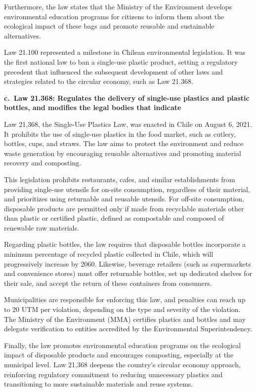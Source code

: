 \documentclass[
  12pt,
  oneside]{book}
\begin{document}
Furthermore, the law states that the Ministry of the Environment
develops environmental education programs for citizens to inform them
about the ecological impact of these bags and promote reusable and
sustainable alternatives.

Law 21.100 represented a milestone in Chilean environmental legislation.
It was the first national law to ban a single-use plastic product,
setting a regulatory precedent that influenced the subsequent
development of other laws and strategies related to the circular
economy, such as Law 21.368.

\textbf{c.~Law 21.368: Regulates the delivery of single-use plastics and
plastic bottles, and modifies the legal bodies that indicate}

Law 21,368, the Single-Use Plastics Law, was enacted in Chile on August
6, 2021. It prohibits the use of single-use plastics in the food market,
such as cutlery, bottles, cups, and straws. The law aims to protect the
environment and reduce waste generation by encouraging reusable
alternatives and promoting material recovery and composting.

This legislation prohibits restaurants, cafes, and similar
establishments from providing single-use utensils for on-site
consumption, regardless of their material, and prioritizes using
returnable and reusable utensils. For off-site consumption, disposable
products are permitted only if made from recyclable materials other than
plastic or certified plastic, defined as compostable and composed of
renewable raw materials.

Regarding plastic bottles, the law requires that disposable bottles
incorporate a minimum percentage of recycled plastic collected in Chile,
which will progressively increase by 2060. Likewise, beverage retailers
(such as supermarkets and convenience stores) must offer returnable
bottles, set up dedicated shelves for their sale, and accept the return
of these containers from consumers.

Municipalities are responsible for enforcing this law, and penalties can
reach up to 20 UTM per violation, depending on the type and severity of
the violation. The Ministry of the Environment (MMA) certifies plastics
and bottles and may delegate verification to entities accredited by the
Environmental Superintendency.

Finally, the law promotes environmental education programs on the
ecological impact of disposable products and encourages composting,
especially at the municipal level. Law 21,368 deepens the country's
circular economy approach, reinforcing regulatory commitment to reducing
unnecessary plastics and transitioning to more sustainable materials and
reuse systems.
\end{document}

